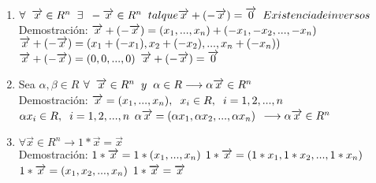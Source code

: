 \documentclass{book}
\begin{document}
\begin{enumerate}
    \item $\\\forall\hspace*{0.2cm}\overrightarrow{x}\in R^n\hspace*{0.2cm}\exists\hspace*{0.2cm}-\overrightarrow{x}\in R^n\hspace*{0.2cm}tal que \overrightarrow{x}+(-\overrightarrow{x})=\overrightarrow{0}\hspace*{0.2cm}Existencia de inversos$
    \\Demostración:
    $\\\overrightarrow{x}+(-\overrightarrow{x})=(x_{1},...,x_{n})+(-x_{1},-x_{2},...,-x_{n})$
    $\\\overrightarrow{x}+(-\overrightarrow{x})=(x_{1}+(-x_{1}),x_{2}+(-x_{2}),...,x_{n}+(-x_{n}))$
    $\\\overrightarrow{x}+(-\overrightarrow{x})=(0,0,...,0)$
    $\\\overrightarrow{x}+(-\overrightarrow{x})=\overrightarrow{0}$
    \item Sea $\alpha,\beta \in R$
    $\\\forall\hspace*{0.2cm}\overrightarrow{x}\in R^n\hspace*{0.2cm}y \hspace*{0.2cm}\alpha\in R\longrightarrow \alpha\overrightarrow{x}\in R^n$
    \\Demostración:
    $\\\overrightarrow{x}=(x_{1},...,x_{n}),\hspace*{0.2cm}x_{i}\in R,\hspace*{0.2cm} i=1,2,...,n$
    $\\\alpha x_{i}\in R,\hspace*{0.2cm}i=1,2,...,n$
    $\\\alpha \overrightarrow{x}=(\alpha x_{1},\alpha x_{2},...,\alpha x_{n})$
    $\\\longrightarrow \alpha \overrightarrow{x}\in R^n$
    \item $\forall \overrightarrow{x}\in R^n\longrightarrow 1*\overrightarrow{x}=\overrightarrow{x}$
    \\Demostración:
    $\\1*\overrightarrow{x}=1*(x_{1},...,x_{n})$
    $\\1*\overrightarrow{x}=(1*x_{1},1*x_{2},...,1*x_{n})$
    $\\1*\overrightarrow{x}=(x_{1},x_{2},...,x_{n})$
    $\\1*\overrightarrow{x}=\overrightarrow{x}$

\end{enumerate}
\end{document}

